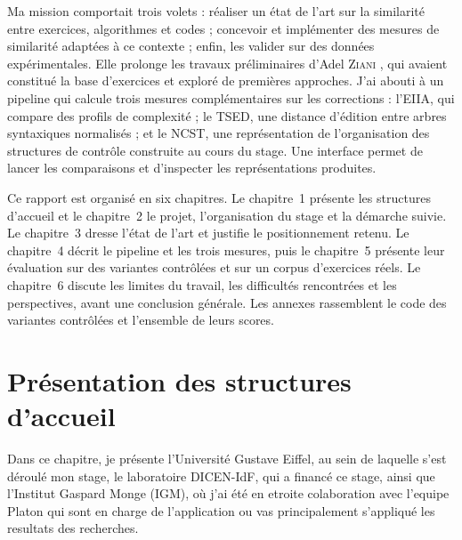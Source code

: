 \documentclass[12pt,a4paper,oneside]{report}
\begin{document}
Ma mission comportait trois volets : réaliser un état de l'art sur la
similarité entre exercices, algorithmes et codes ; concevoir et implémenter
des mesures de similarité adaptées à ce contexte ; enfin, les valider sur
des données expérimentales. Elle prolonge les travaux préliminaires d'Adel
\textsc{Ziani} \cite{ziani_detection_2025}, qui avaient constitué la base
d'exercices et exploré de premières approches. J'ai abouti à un pipeline
qui calcule trois mesures complémentaires sur les corrections : l'EIIA, qui
compare des profils de complexité ; le TSED, une distance d'édition entre
arbres syntaxiques normalisés ; et le NCST, une représentation de
l'organisation des structures de contrôle construite au cours du stage. Une
interface permet de lancer les comparaisons et d'inspecter les
représentations produites.

Ce rapport est organisé en six chapitres. Le chapitre~1 présente les
structures d'accueil et le chapitre~2 le projet, l'organisation du stage
et la démarche suivie. Le chapitre~3 dresse l'état de l'art et justifie
le positionnement retenu. Le chapitre~4 décrit le pipeline et les trois
mesures, puis le chapitre~5 présente leur évaluation sur des variantes
contrôlées et sur un corpus d'exercices réels. Le chapitre~6 discute les
limites du travail, les difficultés rencontrées et les perspectives, avant
une conclusion générale. Les annexes rassemblent le code des variantes
contrôlées et l'ensemble de leurs scores.

\chapter{Présentation des structures d'accueil}

Dans ce chapitre, je présente l'Université Gustave Eiffel, au sein de
laquelle s'est déroulé mon stage, le laboratoire DICEN-IdF, qui a financé
ce stage, ainsi que l'Institut Gaspard Monge (IGM), où j'ai été en etroite
 colaboration avec l'equipe Platon qui sont en charge de l'application ou vas
principalement s'appliqué les resultats des recherches.


\end{document}
